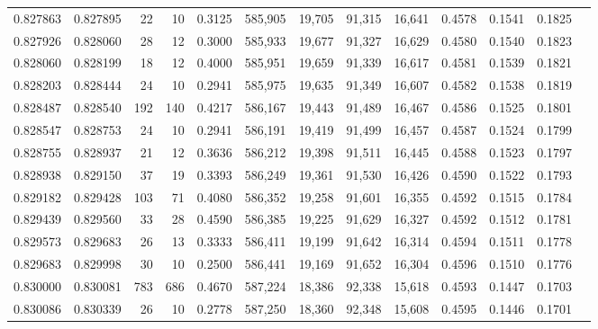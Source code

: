 \begin{tabular}{rrrrrrrrrrrrr}
0.827863 & 0.827895 &    22 &  10 &                                     0.3125 & 585,905 &  19,705 &  91,315 &  16,641 & 0.4578 & 0.1541 & 0.1825 \\
0.827926 & 0.828060 &    28 &  12 &                                     0.3000 & 585,933 &  19,677 &  91,327 &  16,629 & 0.4580 & 0.1540 & 0.1823 \\
0.828060 & 0.828199 &    18 &  12 &                                     0.4000 & 585,951 &  19,659 &  91,339 &  16,617 & 0.4581 & 0.1539 & 0.1821 \\
0.828203 & 0.828444 &    24 &  10 &                                     0.2941 & 585,975 &  19,635 &  91,349 &  16,607 & 0.4582 & 0.1538 & 0.1819 \\
0.828487 & 0.828540 &   192 & 140 &                                     0.4217 & 586,167 &  19,443 &  91,489 &  16,467 & 0.4586 & 0.1525 & 0.1801 \\
0.828547 & 0.828753 &    24 &  10 &                                     0.2941 & 586,191 &  19,419 &  91,499 &  16,457 & 0.4587 & 0.1524 & 0.1799 \\
0.828755 & 0.828937 &    21 &  12 &                                     0.3636 & 586,212 &  19,398 &  91,511 &  16,445 & 0.4588 & 0.1523 & 0.1797 \\
0.828938 & 0.829150 &    37 &  19 &                                     0.3393 & 586,249 &  19,361 &  91,530 &  16,426 & 0.4590 & 0.1522 & 0.1793 \\
0.829182 & 0.829428 &   103 &  71 &                                     0.4080 & 586,352 &  19,258 &  91,601 &  16,355 & 0.4592 & 0.1515 & 0.1784 \\
0.829439 & 0.829560 &    33 &  28 &                                     0.4590 & 586,385 &  19,225 &  91,629 &  16,327 & 0.4592 & 0.1512 & 0.1781 \\
0.829573 & 0.829683 &    26 &  13 &                                     0.3333 & 586,411 &  19,199 &  91,642 &  16,314 & 0.4594 & 0.1511 & 0.1778 \\
0.829683 & 0.829998 &    30 &  10 &                                     0.2500 & 586,441 &  19,169 &  91,652 &  16,304 & 0.4596 & 0.1510 & 0.1776 \\
0.830000 & 0.830081 &   783 & 686 &                                     0.4670 & 587,224 &  18,386 &  92,338 &  15,618 & 0.4593 & 0.1447 & 0.1703 \\
0.830086 & 0.830339 &    26 &  10 &                                     0.2778 & 587,250 &  18,360 &  92,348 &  15,608 & 0.4595 & 0.1446 & 0.1701 \\

\end{tabular}
